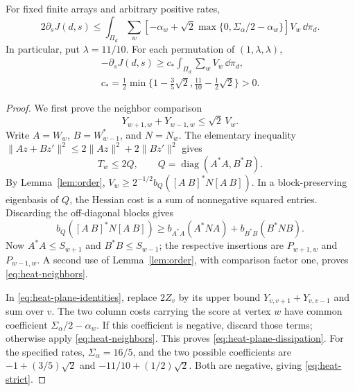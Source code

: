 \begin{lemma}\label{lem:plane-dissipation}
For fixed finite arrays and arbitrary positive rates,
\begin{equation}\label{eq:heat-plane-dissipation}
 2\partial_sJ(d,s)\le\int_{\Pi_d}\sum_w
 \left[-\alpha_w+
 \sqrt2\max\{0,\Sigma_\alpha/2-\alpha_w\}\right]V_w\,\dd\pi_d.
\end{equation}
In particular, put $\lambda=11/10$.  For each permutation of
$(1,\lambda,\lambda)$,
\begin{equation}\label{eq:heat-strict}
 \begin{gathered}
 -\partial_sJ(d,s)\ge c_*\int_{\Pi_d}\sum_wV_w\,\dd\pi_d,\\
 c_* =\tfrac12\min\{1-\tfrac35\sqrt2,
                      \tfrac{11}{10}-\tfrac12\sqrt2\}>0.
 \end{gathered}
\end{equation}
\end{lemma}

\begin{proof}
We first prove the neighbor comparison
\begin{equation}\label{eq:heat-neighbors}
 Y_{w+1,w}+Y_{w-1,w}\le\sqrt2\,V_w.
\end{equation}
Write $A=W_w$, $B=W_{w-1}^*$, and $N=N_w$.  The elementary inequality
$\|Az+Bz'\|^2\le2\|Az\|^2+2\|Bz'\|^2$ gives
\[
 T_w\le2Q,\qquad Q=\operatorname{diag}(A^*A,B^*B).
\]
By Lemma~\ref{lem:order},
$V_w\ge2^{-1/2}b_Q([A\ B]^*N[A\ B])$.
In a block-preserving eigenbasis of $Q$, the Hessian cost is a sum of
nonnegative squared entries.  Discarding the off-diagonal blocks gives
\[
 b_Q([A\ B]^*N[A\ B])
 \ge b_{A^*A}(A^*NA)+b_{B^*B}(B^*NB).
\]
Now $A^*A\le S_{w+1}$ and $B^*B\le S_{w-1}$; the respective insertions
are $P_{w+1,w}$ and $P_{w-1,w}$.  A second use of
Lemma~\ref{lem:order}, with comparison factor one, proves
\eqref{eq:heat-neighbors}.

In \eqref{eq:heat-plane-identities}, replace
$2Z_v$ by its upper bound $Y_{v,v+1}+Y_{v,v-1}$ and sum over $v$.
The two column costs carrying the score at vertex $w$ have common
coefficient $\Sigma_\alpha/2-\alpha_w$.  If this coefficient is
negative, discard those terms; otherwise apply
\eqref{eq:heat-neighbors}.  This proves
\eqref{eq:heat-plane-dissipation}.
For the specified rates, $\Sigma_\alpha=16/5$, and the two possible
coefficients are $-1+(3/5)\sqrt2$ and $-11/10+(1/2)\sqrt2$.
Both are negative, giving \eqref{eq:heat-strict}.
\end{proof}

